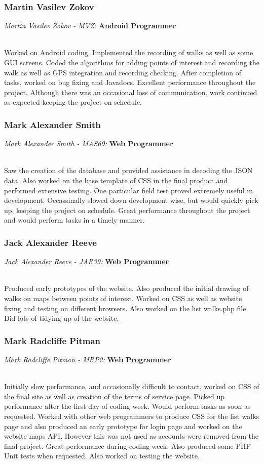 \documentclass[12pt, portrait]{article}
\begin{document}
\subsubsection{Martin Vasilev Zokov }
\centerline{\emph{Martin Vasilev Zokov - MVZ:}\textbf{ Android Programmer}}
~\\
Worked on Android coding. Implemented the recording of walks as well as some GUI screens. Coded the algorithms for adding points of interest and recording the walk as well as GPS integration and recording checking. After completion of tasks, worked on bug fixing and Javadocs. Excellent performance throughout the project. Although there was an occasional loss of communication, work continued as expected keeping the project on schedule.

\subsubsection{Mark Alexander Smith}
\centerline{\emph{Mark Alexander Smith - MAS69:}\textbf{ Web Programmer}}
~\\
Saw the creation of the database and provided assistance in decoding the JSON data. Also worked on the base template of CSS in the final product and performed extensive testing. One particular field test proved extremely useful in development. Occassinally slowed down development wise, but would quickly pick up, keeping the project on schedule. Great performance throughout the project and would perform tasks in a timely manner.
\subsubsection{Jack Alexander Reeve}
\centerline{\emph{Jack Alexander Reeve
 - JAR39:}\textbf{ Web Programmer}}
~\\
Produced early prototypes of the website. Also produced the initial drawing of walks on maps between points of interest. Worked on CSS as well as website fixing and testing on different browsers. Also worked on the list walks.php file. Did lots of tidying up of the website,
\subsubsection{Mark Radcliffe Pitman}
\centerline{\emph{Mark Radcliffe Pitman - MRP2:}\textbf{ Web Programmer}}
~\\
Initially slow performance, and occasionally difficult to contact, worked on CSS of the final site as well as creation of the terms of service page. Picked up performance after the first day of coding week. Would perform tasks as soon as requested. Worked with other web programmers to produce CSS for the list walks page and also produced an early prototype for login page and worked on the website maps API. However this was not used as accounts were removed from the final project. Great performance during coding week. Also produced some PHP Unit tests when requested. Also worked on testing the website.
\end{document}

